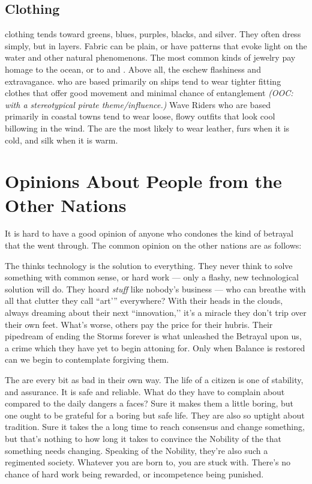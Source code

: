 \documentclass[blue]{GL2020}
\begin{document}
\subsection*{Clothing}
\pShip{} clothing tends toward greens, blues, purples, blacks, and silver. They often dress simply, but in layers. Fabric can be plain, or have patterns that evoke light on the water and other natural phenomenons. The most common kinds of jewelry pay homage to the ocean, or to \cEbb{} and \cFlow{}. Above all, the \pShippies{} eschew flashiness and extravagance. \pShippies{} who are based primarily on ships tend to wear tighter fitting clothes that offer good movement and minimal chance of entanglement \emph{(OOC: with a stereotypical pirate theme/influence.)} Wave Riders who are based primarily in coastal towns tend to wear loose, flowy outfits that look cool billowing in the wind. The \pShippies{} are the most likely to wear leather, furs when it is cold, and silk when it is warm.

\section*{Opinions About People from the Other Nations}
It is hard to have a good opinion of anyone who condones the kind of betrayal that the \pShippies{} went through. The common opinion on the other nations are as follows:

The \pTech{} thinks technology is the solution to everything. They never think to solve something with common sense, or hard work — only a flashy, new technological solution will do. They hoard \emph{stuff} like nobody's business — who can breathe with all that clutter they call ``art'” everywhere? With their heads in the clouds, always dreaming about their next ``innovation,'’ it's a miracle they don't trip over their own feet. What's worse, others pay the price for their hubris. Their pipedream of ending the Storms forever is what unleashed the Betrayal upon us, a crime which they have yet to begin attoning for. Only when Balance is restored can we begin to contemplate forgiving them.

The \pFarm{} are every bit as bad in their own way. The life of a \pFarm{} citizen is one of stability, and assurance. It is safe and reliable. What do they have to complain about compared to the daily dangers a \pShippie{} faces? Sure it makes them a little boring, but one ought to be grateful for a boring but safe life. They are also so uptight about tradition. Sure it takes the \pShip{} a long time to reach consensus and change something, but that's nothing to how long it takes to convince the Nobility of the \pFarm{} that something needs changing. Speaking of the Nobility, they're also such a regimented society. Whatever you are born to, you are stuck with. There's no chance of hard work being rewarded, or incompetence being punished.
\end{document}
